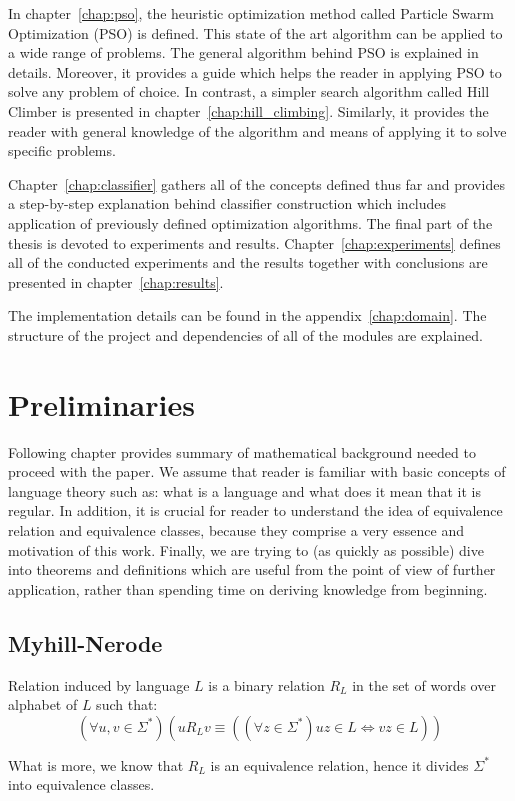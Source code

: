 \documentclass{mini}
\begin{document}
In chapter~\ref{chap:pso}, the heuristic optimization method called Particle Swarm Optimization (PSO) is defined. This state of the art algorithm can be applied to a wide range of problems. The
general algorithm behind PSO is explained in details. Moreover, it provides a guide which helps the reader in applying PSO to solve any problem of choice. In contrast, a simpler search algorithm called Hill Climber is presented in chapter~\ref{chap:hill_climbing}. Similarly, it provides the reader with general knowledge of the algorithm and means of applying it to solve specific problems.

Chapter~\ref{chap:classifier} gathers all of the concepts defined thus far and provides a step-by-step explanation behind classifier construction which includes application of previously defined optimization algorithms. The final part of the thesis is devoted to experiments and results.  Chapter~\ref{chap:experiments} defines all of the conducted experiments and the results together with conclusions are presented in chapter~\ref{chap:results}.

The implementation details can be found in the appendix~\ref{chap:domain}. The structure of the project and dependencies of all of the modules are explained.


\chapter{Preliminaries}\label{chap:prelim}
Following chapter provides summary of mathematical background needed to proceed with the paper. We assume that reader is familiar with basic concepts of language theory such as: what is a language and what does it mean that it is regular. In addition, it is crucial for reader to understand the idea of equivalence relation and equivalence classes, because they comprise a very essence and motivation of this work. Finally, we are trying to (as quickly as possible) dive into theorems and definitions which are useful from the point of view of further application, rather than spending time on deriving knowledge from beginning.
\section{Myhill-Nerode}
\begin{definition} \label{def:myhill}
    Relation induced by language $L$ is a binary relation $R_{L}$ in the set of words over alphabet of $L$ such that:
    \[
    (\forall{u,v \in \Sigma^{*}})(u R_{L} v \equiv ((\forall z \in \Sigma^{*}) uz \in L \Leftrightarrow vz \in L))
    \]
\end{definition}
What is more, we know that $R_{L}$ is an equivalence relation, hence it divides $\Sigma^{*}$ into equivalence classes.
\end{document}
